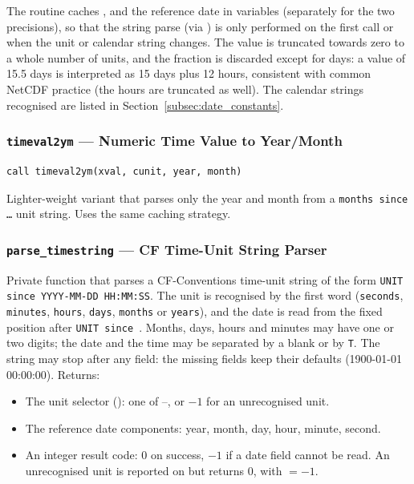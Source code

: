 The routine caches ,  and the reference date in
 variables (separately for the two precisions), so that the
string parse (via ) is only performed on the first
call or when the unit or calendar string changes. The value is truncated
towards zero to a whole number of units, and the fraction is discarded
except for days: a value of 15.5 days is interpreted as 15 days plus
12 hours, consistent with common NetCDF practice (the hours are truncated as
well). The calendar strings recognised are listed in
Section~\ref{subsec:date_constants}.

\subsubsection{\texttt{timeval2ym} --- Numeric Time Value to Year/Month}

\begin{lstlisting}
call timeval2ym(xval, cunit, year, month)
\end{lstlisting}

Lighter-weight variant that parses only the year and month from a
\texttt{months since \ldots} unit string. Uses the same caching strategy.

\subsubsection{\texttt{parse\_timestring} --- CF Time-Unit String Parser}

Private function that parses a CF-Conventions time-unit string of the form
\texttt{UNIT since YYYY-MM-DD HH:MM:SS}. The unit is recognised by the first
word (\texttt{seconds}, \texttt{minutes}, \texttt{hours}, \texttt{days},
\texttt{months} or \texttt{years}), and the date is read from the fixed
position after \texttt{UNIT since }. Months, days, hours and minutes may
have one or two digits; the date and the time may be separated by a blank or
by \texttt{T}. The string may stop after any field: the missing fields keep
their defaults (1900-01-01 00:00:00). Returns:
\begin{itemize}
  \item The unit selector (): one of --,
        or $-1$ for an unrecognised unit.
  \item The reference date components: year, month, day, hour, minute, second.
  \item An integer result code: 0 on success, $-1$ if a date field cannot be
        read. An unrecognised unit is reported on  but returns
        0, with  $= -1$.
\end{itemize}

